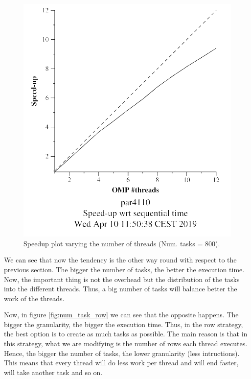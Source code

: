 \documentclass[12pt, a4paper]{article}
\begin{document}
\begin{figure}[H]
\begin{minipage}[b]{0.4\linewidth}
  \includegraphics[scale=0.5]{./mandel-omp-10000-strong-omp-3-800-speedup}
  \caption{Speedup plot varying the number of threads (Num. tasks = 800).}
  \label{fig:mandel-omp-10000-strong-omp-3-800-speedup}
\end{minipage}
\end{figure}

We can see that now the tendency is the other way round with respect to the previous section. The bigger the number of tasks, the better the execution time. Now, the important thing is not the overhead but the distribution of the tasks into the different threads. Thus, a big number of tasks will balance better the work of the threads.

Now, in figure \ref{fig:num_task_row} we can see that the opposite happens. The bigger the granularity, the bigger the execution time. Thus, in the row strategy, the best option is to create as much tasks as possible. The main reason is that in this strategy, what we are modifying is the number of rows each thread executes. Hence, the bigger the number of tasks, the lower granularity (less intructions). This means that every thread will do less work per thread and will end faster, will take another task and so on.
\end{document}
